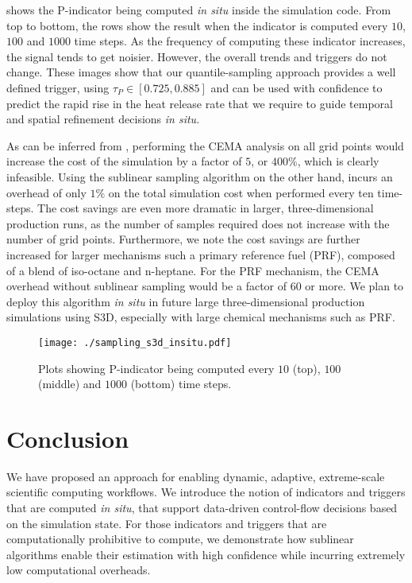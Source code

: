 \documentclass[final]{siamltex}
\newcommand{\pmetric}{P}
\newcommand{\thresh}{\tau}
\begin{document}
  shows the \pmetric-indicator being computed \emph{in situ} inside the simulation code. 
From top to bottom, the rows show the result when the indicator is computed every $10$,
$100$ and $1000$ time steps.  As the frequency of computing these indicator increases, 
the signal tends to get noisier. However, the overall trends and triggers do not change.   
These images show that our quantile-sampling approach provides a well defined trigger, using $\thresh_{\pmetric} \in
[0.725, 0.885]$ and can be used with confidence to predict the rapid rise in the heat release rate that we require to 
guide temporal and spatial refinement decisions \emph{in situ}. 

As can be inferred from , performing the 
CEMA analysis on all grid points would increase the cost of the simulation by a factor of $5$, or $400\%$, which 
is clearly infeasible. Using the sublinear sampling algorithm on the other hand, incurs an overhead of only $1\%$ 
on the total simulation cost when performed every ten time-steps.  The cost
savings are even more dramatic in larger, three-dimensional production runs, as
the number of samples required does not increase with the number of grid
points.  Furthermore, we note the cost savings are further increased for 
larger mechanisms such a primary reference fuel (PRF), composed of a blend of
iso-octane and n-heptane.  For the PRF mechanism, the CEMA 
overhead without sublinear sampling would be a factor of $60$ or more. We plan
to deploy this algorithm \emph{in situ} in future 
large three-dimensional production simulations using S3D, especially with large chemical mechanisms such as PRF.     

\begin{figure}[htpb]
\texttt{[image: ./sampling\_s3d\_insitu.pdf]}
\caption{\label{fig:M_p_insitu} Plots showing \pmetric-indicator being computed every $10$ (top), 
$100$ (middle) and $1000$ (bottom) time steps. }
\end{figure}

\section{Conclusion}
\label{sec:conc} 
We have proposed an approach for enabling dynamic, adaptive, extreme-scale 
scientific computing workflows.  We introduce the notion of indicators and 
triggers that are computed \emph{in situ}, that support data-driven control-flow 
decisions based on the simulation state. For those indicators and triggers that
are computationally prohibitive to compute, we demonstrate how sublinear 
algorithms enable their estimation with high confidence while incurring 
extremely low computational overheads.
\end{document}
